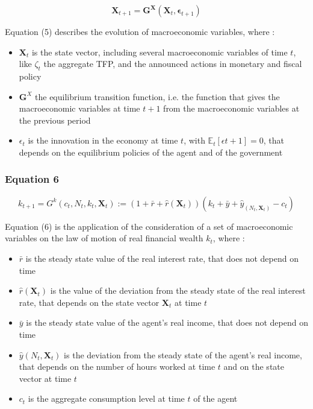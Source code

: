 \documentclass{article}
\begin{document}
\begin{equation}
    \bm{X}_{t+1}=\bm{G}^{\bm{X}}\left(\bm{X}_{t},\bm{\epsilon}_{t+1}\right)
\end{equation}

Equation (5) describes the evolution of macroeconomic variables, where : 
\begin{itemize}
    \item $\bm{X}_t$ is the state vector, including several macroeconomic variables of time $t$, like $\zeta_t$ the aggregate TFP, and the announced actions in monetary and fiscal policy
    \item $\bm{G}^X$ the equilibrium transition function, i.e. the function that gives the macroeconomic variables at time $t+1$ from the macroeconomic variables at the previous period
    \item $\epsilon_{t}$ is the innovation in the economy at time $t$, with $\mathbb{E}_{t}\left[\epsilon{t+1}\right]=0$, that depends on the equilibrium policies of the agent and of the government
\end{itemize}

\subsubsection*{Equation 6}

\begin{equation}
    k_{t+1}=G^{k}(c_{t},N_{t}, k_{t}, \bm{X}_{t}):= (1+\bar{r}+\hat{r}(\bm{X}_{t}))(k_{t}+\bar{y}+\hat{y}_(N_{t},\bm{X}_{t})-c_{t})
\end{equation}

Equation (6) is the application of the consideration of a set of macroeconomic variables on the law of motion of real financial wealth $k_{t}$, where : 
\begin{itemize}
    \item $\bar{r}$ is the steady state value of the real interest rate, that does not depend on time
    \item $\hat{r}(\bm{X}_{t})$ is the value of the deviation from the steady state of the real interest rate, that depends on the state vector $\bm{X}_{t}$ at time $t$
    \item $\bar{y}$ is the steady state value of the agent's real income, that does not depend on time
    \item $\hat{y}(N_{t},\bm{X}_{t})$ is the deviation from the steady state of the agent's real income, that depends on the number of hours worked at time $t$ and on the state vector at time $t$
    \item $c_{t}$ is the aggregate consumption level at time $t$ of the agent
\end{itemize}
\end{document}
